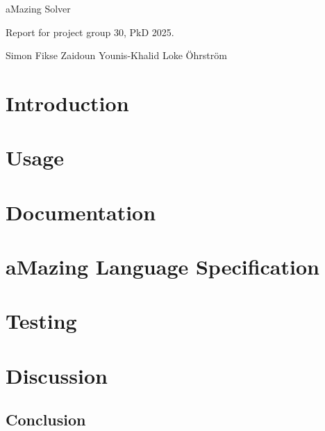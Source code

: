 \documentclass[12pt, a4paper]{article}
\begin{document}
\begin{titlepage}
    \vspace*{\fill}
    \begin{center}

        \begin{LARGE}
            aMazing Solver
        \end{LARGE}

        \vspace{5mm}

        \begin{large}
            Report for project group 30, PkD 2025.
        \end{large}

        \vspace{5mm}

        Simon Fikse \quad Zaidoun Younis-Khalid \quad Loke Öhrström

    \end{center}
    \vspace*{\fill}
\end{titlepage}

\newpage
\tableofcontents
\newpage

\section{Introduction}


\section{Usage}

\newpage

\section{Documentation}

\newpage

\section{aMazing Language Specification}

\newpage

\section{Testing}

\newpage

\section{Discussion}

\subsection{Conclusion}
\end{document}

